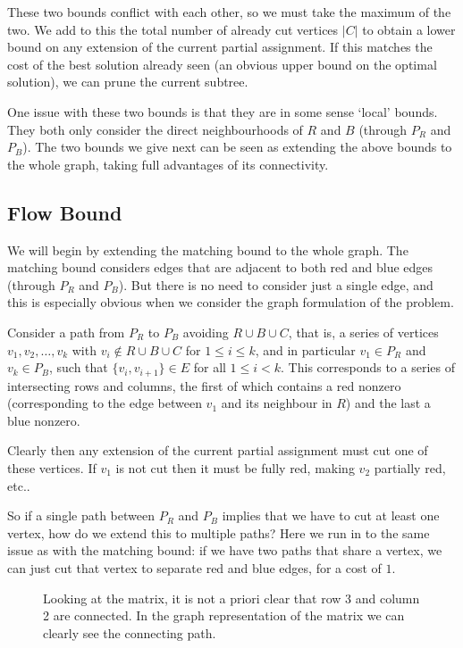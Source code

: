 	These two bounds conflict with each other, so we must take the maximum of
	the two. We add to this the total number of already cut vertices $|C|$ to
	obtain a lower bound on any extension of the current partial assignment.
	If this matches the cost of the best solution already seen (an obvious
	upper bound on the optimal solution), we can prune the current subtree.

	One issue with these two bounds is that they are in some sense `local'
	bounds. They both only consider the direct neighbourhoods of $R$ and $B$
	(through $P_R$ and $P_B$). The two bounds we give next can be seen as
	extending the above bounds to the whole graph, taking full advantages of
	its connectivity.

	\subsection{Flow Bound}

	We will begin by extending the matching bound to the whole graph. The
	matching bound considers edges that are adjacent to both red and blue
	edges (through $P_R$ and $P_B$). But there is no need to consider just
	a single edge, and this is especially obvious when we consider the graph
	formulation of the problem.

	Consider a path from $P_R$ to $P_B$ avoiding $R \cup B \cup C$, that is,
	a series of vertices $v_1, v_2, \dots, v_k$ with
	$v_i \not\in R\cup B\cup C$ for $1 \leq i\leq k$,
	and in particular $v_1 \in P_R$ and $v_k \in P_B$,
	such that $\{v_i, v_{i+1}\} \in E$ for all $1 \leq i < k$. This
	corresponds to a series of intersecting rows and columns, the first of
	which contains a red nonzero (corresponding to the edge between $v_1$ and
	its neighbour in $R$) and the last a blue nonzero.

	Clearly then any extension of the current partial assignment must cut one
	of these vertices. If $v_1$ is not cut then it must be fully red, making
	$v_2$ partially red, etc..

	So if a single path between $P_R$ and $P_B$ implies that we have to cut at
	least one vertex, how do we extend this to multiple paths? Here we run in
	to the same issue as with the matching bound: if we have two paths that
	share a vertex, we can just cut that vertex to separate red and blue edges,
	for a cost of $1$.

	\begin{figure*}
		
		\centering
		\label{fig-flow}
		\caption{Looking at the matrix, it is not a priori clear that row 3
			and column 2 are connected. In the graph representation of the
			matrix we can clearly see the connecting path.}
	\end{figure*}

